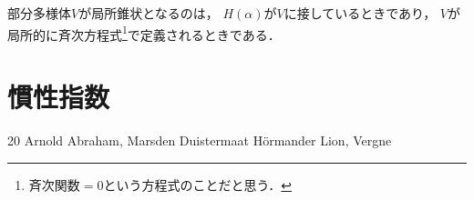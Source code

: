 \documentclass[leqno, 10pt, a4paper, dvipdfmx]{jsarticle}
\theoremstyle{definition}
\numberwithin{equation}{section}
\theoremstyle{mystyle}
\begin{document}
部分多様体\(V\)が局所錐状となるのは，
\(H(\alpha)\)が\(V\)に接しているときであり，
\(V\)が局所的に斉次方程式\footnote{
    斉次関数\(=0\)という方程式のことだと思う．
}で定義されるときである．


\section{慣性指数}\label{sec:A.3}















\begin{thebibliography}{20} 
     Arnold
     Abraham, Marsden
     Duistermaat
     H\"ormander
     Lion, Vergne
\end{thebibliography}

\end{document}
